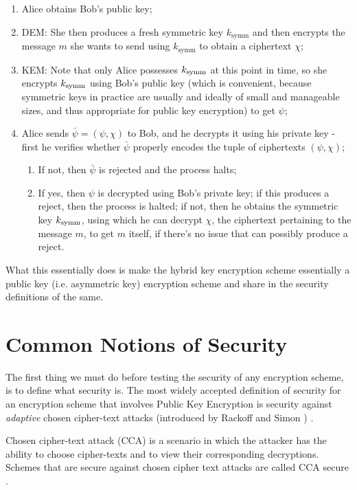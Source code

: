 \begin{enumerate}
\item Alice obtains Bob's public key;
\item \textsc{DEM}: She then produces a fresh symmetric key $k_\text{symm}$ and then encrypts the message $m$ she wants to send using $k_\text{symm}$ to obtain a ciphertext $\chi$;
\item \textsc{KEM}: Note that only Alice possesses $k_{\text{symm}}$ at this point in time, so she encrypts $k_{\text{symm}}$ using Bob's public key (which is convenient, because symmetric keys in practice are usually and ideally of small and manageable sizes, and thus appropriate for public key encryption) to get $\psi$;
\item Alice sends $\bar\psi=(\psi,\chi)$ to Bob, and he decrypts it using his private key - first he verifies whether $\bar\psi$ properly encodes the tuple of ciphertexts $(\psi,\chi)$;

\begin{enumerate}
\item If not, then $\bar\psi$ is rejected and the process halts;
\item If yes, then $\psi$ is decrypted using Bob's private key; if this produces a reject, then the process is halted; if not, then he obtains the symmetric key $k_{\text{symm}}$, using which he can decrypt $\chi$, the ciphertext pertaining to the message $m$, to get $m$ itself, if there's no issue that can possibly produce a reject.
\end{enumerate}

\end{enumerate}

What this essentially does is make the hybrid key encryption scheme essentially a public key (i.e. asymmetric key) encryption scheme and share in the security definitions of the same.\\

\section{Common Notions of Security}

The first thing we must do before testing the security of any encryption scheme, is to define what security is. The most widely accepted definition of security for an encryption scheme that involves Public Key Encryption is security against \emph{adaptive} chosen cipher-text attacks (introduced by Rackoff and Simon \cite{RS}) \cite{shoup_cca}.

Chosen cipher-text attack (CCA) is a scenario in which the attacker has the ability to choose cipher-texts and to view their corresponding decryptions.
Schemes that are secure against chosen cipher text attacks are called CCA secure \cite{springer_cca}.

